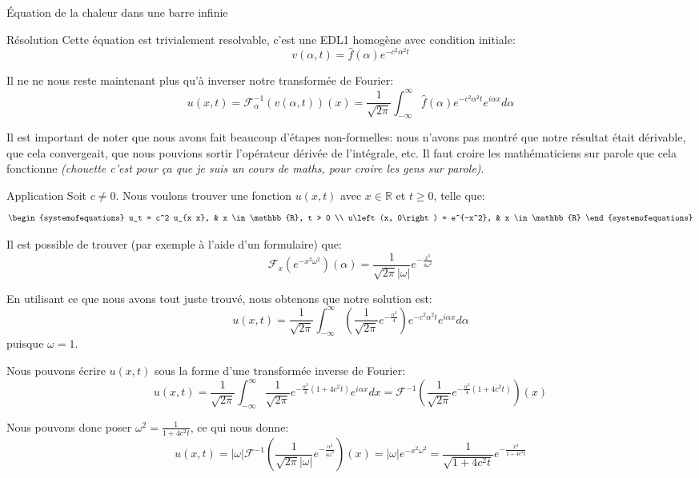 \documentclass[a4paper]{article}
\begin{document}
\begin{parag}{Équation de la chaleur dans une barre infinie}
\begin{subparag}{Résolution}
        Cette équation est trivialement resolvable, c'est une EDL1 homogène avec condition initiale: 
        \[v\left(\alpha, t\right) = \hat{f}\left(\alpha\right) e^{-c^2 \alpha^2 t}\]

        Il ne ne nous reste maintenant plus qu'à inverser notre transformée de Fourier: 
        \[u\left(x, t\right) = \mathcal{F}_{\alpha}^{-1}\left(v\left(\alpha, t\right)\right)\left(x\right) = \frac{1}{\sqrt{2\pi}} \int_{-\infty}^{\infty} \hat{f}\left(\alpha\right) e^{-c^2 \alpha^2 t} e^{i \alpha x} d\alpha\]

        Il est important de noter que nous avons fait beaucoup d'étapes non-formelles: nous n'avons pas montré que notre résultat était dérivable, que cela convergeait, que nous pouvions sortir l'opérateur dérivée de l'intégrale, etc. Il faut croire les mathématiciens sur parole que cela fonctionne \textit{(chouette c'est pour ça que je suis un cours de maths, pour croire les gens sur parole)}.
    \end{subparag}
\end{parag}

\begin{parag}{Application}
    Soit $c \neq 0$. Nous voulons trouver une fonction $u\left(x, t\right)$ avec $x \in \mathbb{R}$ et $t \geq 0$, telle que: 
    \[\begin{systemofequations} u_t = c^2 u_{x x}, & x \in \mathbb{R}, t > 0 \\ u\left(x, 0\right) = e^{-x^2}, & x \in \mathbb{R} \end{systemofequations}\]

    Il est possible de trouver (par exemple à l'aide d'un formulaire) que: 
    \[\mathcal{F}_x\left(e^{-x^2 \omega^2}\right)\left(\alpha\right) = \frac{1}{\sqrt{2\pi}\left|\omega\right|} e^{-\frac{x^2}{4\omega^2}}\]
    

    En utilisant ce que nous avons tout juste trouvé, nous obtenons que notre solution est: 
    \[u\left(x, t\right) = \frac{1}{\sqrt{2\pi}} \int_{-\infty}^{\infty} \left(\frac{1}{\sqrt{2\pi}} e^{-\frac{\alpha^2}{4}}\right) e^{-c^2 \alpha^2 t} e^{i \alpha x} d\alpha\]
    puisque $\omega = 1$.

    Nous pouvons écrire $u\left(x, t\right)$ sous la forme d'une transformée inverse de Fourier: 
    \[u\left(x, t\right) = \frac{1}{\sqrt{2\pi}} \int_{-\infty}^{\infty} \frac{1}{\sqrt{2\pi}} e^{-\frac{\alpha^2}{4} \left(1 + 4c^2 t\right)} e^{i\alpha x}dx = \mathcal{F}^{-1}\left(\frac{1}{\sqrt{2\pi}}e^{-\frac{\alpha^2}{4}\left(1 + 4 c^2 t\right)}\right)\left(x\right)\]

    Nous pouvons donc poser $\omega^2 = \frac{1}{1 + 4c^2 t}$, ce qui nous donne: 
    \[u\left(x,t\right) = \left|\omega\right| \mathcal{F}^{-1}\left(\frac{1}{\sqrt{2\pi} \left|\omega\right|}e^{-\frac{\alpha^2}{4\omega^2}}\right)\left(x\right) = \left|\omega\right| e^{-x^2 \omega^2} = \frac{1}{\sqrt{1 + 4c^2 t}} e^{-\frac{x^2}{1 + 4c^2 t}}\]
\end{parag}
\end{document}
